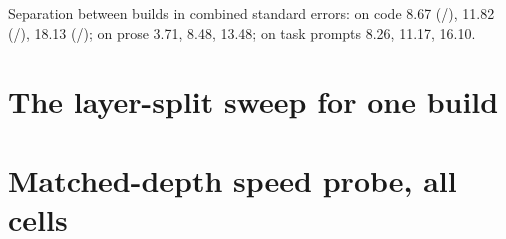 Separation between builds in combined standard errors: on code 8.67 (\Qsix/\Qfive), 11.82
(\Qfive/\Qfour), 18.13 (\Qsix/\Qfour); on prose 3.71, 8.48, 13.48; on task prompts 8.26, 11.17, 16.10.

\section{The layer-split sweep for one build}\label{app:ts}

\begin{table}[h]
\centering\small
\caption{\Qfive{} at 262{,}144 tokens, first battery, MTP $n{=}2$,  KV, prefill to 94.8\,\%
(248{,}522 tokens), first repetition of each split. Balance and speed are unrelated except for one
unexplained outlier.}\label{tab:q5sweep}
\end{table}

\section{Matched-depth speed probe, all cells}\label{app:speed}

